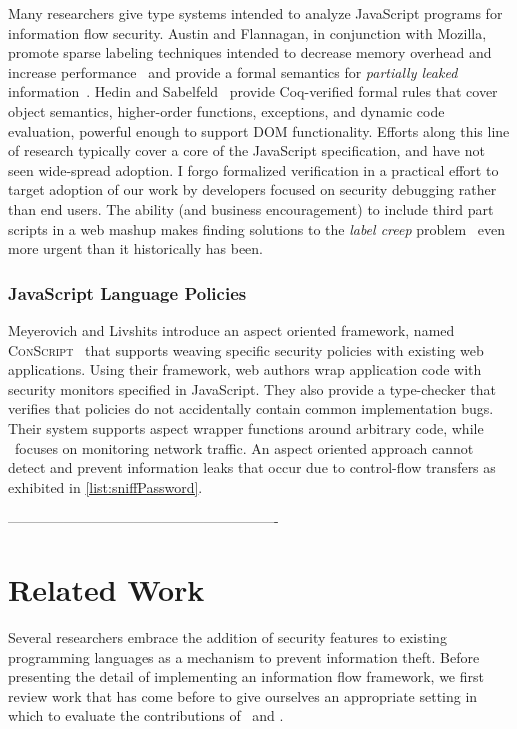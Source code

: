 Many researchers give type systems intended to analyze JavaScript programs for information flow security.
Austin and Flannagan, in conjunction with Mozilla, promote sparse labeling techniques intended to decrease memory overhead and increase performance~\cite{austin.flanagan+09} and provide a formal semantics for \emph{partially leaked} information~\cite{austin.flanagan+10}.
Hedin and Sabelfeld~\cite{hedin.sabelfeld+12} provide Coq-verified formal rules that cover object semantics, higher-order functions, exceptions, and dynamic code evaluation, powerful enough to support DOM functionality.
Efforts along this line of research typically cover a core of the JavaScript specification, and have not seen wide-spread adoption.
I forgo formalized verification in a practical effort to target adoption of our work by developers focused on security debugging rather than end users.
The ability (and business encouragement) to include third part scripts in a web mashup makes finding solutions to the \emph{label creep} problem~\cite{sabelfeld.myers+03} even more urgent than it historically has been.

\subsection{JavaScript Language Policies}

Meyerovich and Livshits introduce an aspect oriented framework, named \textsc{ConScript}~\cite{meyerovich.livshits+10} that supports weaving specific security policies with existing web applications.
Using their framework, web authors wrap application code with security monitors specified in JavaScript.
They also provide a type-checker that verifies that policies do not accidentally contain common implementation bugs.
Their system supports aspect wrapper functions around arbitrary code, while \FlowCore\ focuses on monitoring network traffic.
An aspect oriented approach cannot detect and prevent information leaks that occur due to control-flow transfers as exhibited in \autoref{list:sniffPassword}.





----------------------------------------------------------

\chapter{Related Work}

Several researchers embrace the addition of security features to existing programming languages as a mechanism to prevent information theft.
Before presenting the detail of implementing an information flow framework, we first review work that has come before to give ourselves an appropriate setting in which to evaluate the contributions of \FlowCore\ and \JitFlow.

